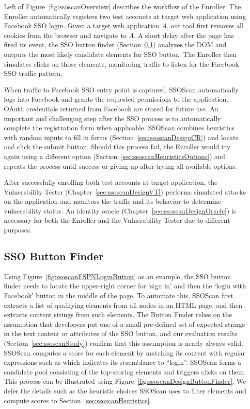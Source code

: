 Left of Figure~\ref{fig:ssoscanOverview} describes the workflow of the Enroller.  The Enroller automatically registers two test accounts at target web application using Facebook SSO login.  Given a target web application \emph{A}, our tool first removes all cookies from the browser and navigate to \emph{A}.  A short delay after the page has fired its  event, the SSO button finder (Section~\ref{sec:ssoscanDesignBF}) analyzes the DOM and outputs the most likely candidate elements for SSO button.  The Enroller then simulates clicks on those elements, monitoring traffic to listen for the Facebook SSO traffic pattern.

When traffic to Facebook SSO entry point is captured, SSOScan automatically logs into Facebook and grants the requested permissions to the application.  OAuth credentials returned from Facebook are stored for future use.  An important and challenging step after the SSO process is to automatically complete the registration form when applicable.  SSOScan combines heuristics with random inputs to fill in forms (Section~\ref{sec:ssoscanDesignCR}) and locate and click the submit button.  Should this process fail, the Enroller would try again using a different option (Section~\ref{sec:ssoscanHeuristicsOptions}) and repeats the process until success or giving up after trying all available options.  

After successfully enrolling both test accounts at target application, the Vulnerability Tester (Chapter~\ref{sec:ssoscanDesignVT}) performs simulated attacks on the application and monitors the traffic and its behavior to determine vulnerability status.  An identity oracle (Chapter~\ref{sec:ssoscanDesignOracle}) is necessary for both the Enroller and the Vulnerability Tester due to different purposes.

\subsection{SSO Button Finder}
\label{sec:ssoscanDesignBF}

Using Figure~\ref{fig:ssoscanESPNLoginButton} as an example, the SSO button finder needs to locate the upper-right corner for `sign in' and then the `login with Facebook' button in the middle of the page.  To automate this, SSOScan first extracts a list of qualifying elements from all nodes in an HTML page, and then extracts content strings from such elements.  The Button Finder relies on the assumption that developers put one of a small pre-defined set of expected strings in the text content or attributes of the SSO button, and our evaluation results (Section~\ref{sec:ssoscanStudy}) confirm that this assumption is nearly always valid.  SSOScan computes a score for each element by matching its content with regular expressions such as \code{[Ll][Oo][Gg][IiOo][Nn]} which indicates its resemblance to ``login''.  SSOScan forms a candidate pool consisting of the top-scoring elements and triggers clicks on them.  This process can be illustrated using Figure~\ref{fig:ssoscanDesignButtonFinder}.  We defer the details such as the heuristic choices SSOScan uses to filter elements and compute scores to Section~\ref{sec:ssoscanHeuristics}.

